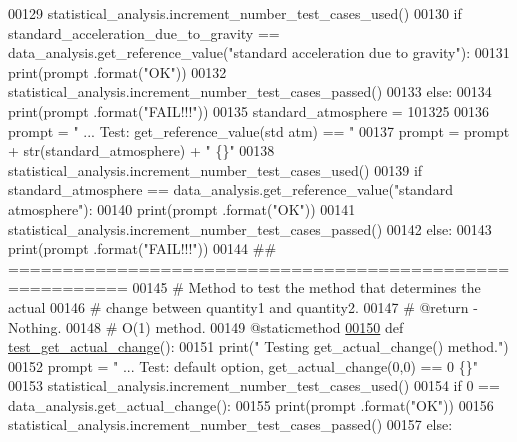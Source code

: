 \begin{DoxyCode}
00129         statistical\_analysis.increment\_number\_test\_cases\_used()
00130         \textcolor{keywordflow}{if} standard\_acceleration\_due\_to\_gravity == data\_analysis.get\_reference\_value(\textcolor{stringliteral}{"standard acceleration
       due to gravity"}):
00131             print(prompt .format(\textcolor{stringliteral}{"OK"}))
00132             statistical\_analysis.increment\_number\_test\_cases\_passed()
00133         \textcolor{keywordflow}{else}:
00134             print(prompt .format(\textcolor{stringliteral}{"FAIL!!!"}))
00135         standard\_atmosphere = 101325
00136         prompt = \textcolor{stringliteral}{"  ... Test: get\_reference\_value(std atm) == "}
00137         prompt = prompt + str(standard\_atmosphere) + \textcolor{stringliteral}{"  \{\}"}
00138         statistical\_analysis.increment\_number\_test\_cases\_used()
00139         \textcolor{keywordflow}{if} standard\_atmosphere == data\_analysis.get\_reference\_value(\textcolor{stringliteral}{"standard atmosphere"}):
00140             print(prompt .format(\textcolor{stringliteral}{"OK"}))
00141             statistical\_analysis.increment\_number\_test\_cases\_passed()
00142         \textcolor{keywordflow}{else}:
00143             print(prompt .format(\textcolor{stringliteral}{"FAIL!!!"}))
00144     \textcolor{comment}{## =========================================================}
00145     \textcolor{comment}{#   Method to test the method that determines the actual}
00146     \textcolor{comment}{#       change between quantity1 and quantity2.}
00147     \textcolor{comment}{#   @return - Nothing.}
00148     \textcolor{comment}{#   O(1) method.}
00149     @staticmethod
\hypertarget{test__data__analysis__tool_8py_source_l00150}{}\hyperlink{classstatistics_1_1test__data__analysis__tool_1_1data__analysis__tester_af355b89d75dbd6f03b47a52bcfdb9025}{00150}     \textcolor{keyword}{def }\hyperlink{classstatistics_1_1test__data__analysis__tool_1_1data__analysis__tester_af355b89d75dbd6f03b47a52bcfdb9025}{test\_get\_actual\_change}():
00151         print(\textcolor{stringliteral}{" Testing get\_actual\_change() method."})
00152         prompt = \textcolor{stringliteral}{"  ... Test: default option, get\_actual\_change(0,0) == 0   \{\}"}
00153         statistical\_analysis.increment\_number\_test\_cases\_used()
00154         \textcolor{keywordflow}{if} 0 == data\_analysis.get\_actual\_change():
00155             print(prompt .format(\textcolor{stringliteral}{"OK"}))
00156             statistical\_analysis.increment\_number\_test\_cases\_passed()
00157         \textcolor{keywordflow}{else}:

\end{DoxyCode}
